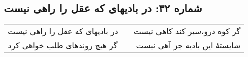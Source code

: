 \begin{center}
\section*{شماره ۳۲: در بادیهای که عقل را راهی نیست}
\label{sec:032}
\begin{longtable}{l p{0.5cm} r}
در بادیهای که عقل را راهی نیست
&&
گر کوه درو،‌سیر کند کاهی نیست
\\
گر هیچ روندهای طلب خواهی کرد
&&
شایستهٔ این بادیه جز آهی نیست
\\
\end{longtable}
\end{center}
